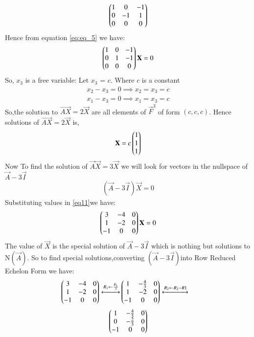 \documentclass[journal,12pt,twocolumn]{IEEEtran}
\begin{document}
\begin{flushleft}
\begin{align} \label{eq:eq_5}
    \begin{pmatrix}1&0&-1\\
    0&-1&1\\
    0&0&0\end{pmatrix} 
\end{align}
Hence from equation \eqref{eq:eq_5} we have:
\begin{align}
\begin{pmatrix}1&0&-1\\
0&1&-1\\
0&0&0
\end{pmatrix}
\mathbf{X}=0
\end{align}
So, $x_3$ is a free variable: Let $x_3$ = $c$. Where $c$ is a constant
\begin{align}
 {x_2}-{x_3}=0 \implies{x_2}={x_3}=c \\
 {x_1}-{x_3}=0 \implies{x_1}={x_3}=c 
 \end{align}
 So,the solution to $\vec{AX} =2\vec{X}$ are all elements of $\vec{F}^3$ of form $(c,c,c)$. 
 Hence solutions of
 $\vec{AX}=2\vec{X}$ is,
 \begin{align}\label{eq:555}
 \mathbf{X} = 
 c
 \begin{pmatrix}
 1\\1\\1
 \end{pmatrix}
\end{align}
 Now To find the solution of $\vec{A}\vec{X}=3\vec{X}$ we will look for vectors in the nullspace of $\vec{A}-3\vec{I}$ 
 \begin{align}\label{eq11}
(\vec{A}-3\vec{I})\vec X=0
\end{align}
Substituting values in \eqref{eq11}we have:
\begin{align}
\begin{pmatrix}3&-4&0\\
1&-2&0\\
-1&0&0
\end{pmatrix}\mathbf X=0
\end{align} 
The value of $\vec X$ is the special solution of $\vec A-3\vec I$ which is nothing but solutions to N$(\vec{A})$.
So to find special solutions,converting $(\vec A-3\vec I)$into
Row Reduced Echelon Form we have:
\begin{align}
\begin{pmatrix}3& -4&0\\
1 & -2 & 0\\
-1 & 0 &0
\end{pmatrix}
\xleftrightarrow[]{R_1 \leftarrow \frac{R_1}{3} } 
&
\begin{pmatrix}1&-\frac{4}{3}&0\\
1&-2&0\\
-1&0&0\end{pmatrix}
\xleftrightarrow[]{R_2 \leftarrow R_2-R1} \nonumber 
\end{align}
\begin{align}
    \myvec{1&-\frac{4}{3}&0\\
            0&-\frac{2}{3}&0\\
            -1&0&0}

\end{align}
\end{flushleft}
\end{document}
